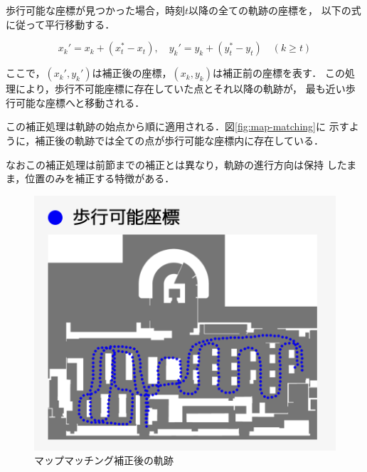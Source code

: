歩行可能な座標が見つかった場合，時刻$t$以降の全ての軌跡の座標を，
以下の式に従って平行移動する．

\begin{equation}
x_k' = x_k + (x_t^* - x_t), \quad y_k' = y_k + (y_t^* - y_t) \quad (k \geq t)
\end{equation}

ここで，$(x_k', y_k')$は補正後の座標，$(x_k, y_k)$は補正前の座標を表す．
この処理により，歩行不可能座標に存在していた点とそれ以降の軌跡が，
最も近い歩行可能な座標へと移動される．

この補正処理は軌跡の始点から順に適用される．図\ref{fig:map-matching}に
示すように，補正後の軌跡では全ての点が歩行可能な座標内に存在している．

なおこの補正処理は前節までの補正とは異なり，軌跡の進行方向は保持
したまま，位置のみを補正する特徴がある．
\begin{figure}[H]
    \centering
    \includegraphics[width=\linewidth]{../image/walkable-points.jpg}
    \caption{マップマッチング補正後の軌跡}    \label{fig:walkable-points}
\end{figure}
